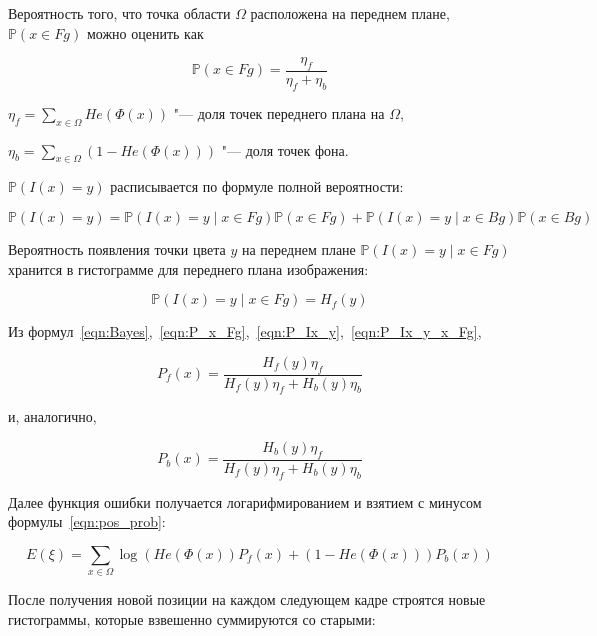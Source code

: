 Вероятность того, что точка области $\Omega$ расположена на переднем плане,
$\mathbb{P}(x \in Fg)$ можно оценить как

\begin{equation}
\label{eqn:P_x_Fg}
\mathbb{P}(x \in Fg) = \frac{\eta_f}{\eta_f + \eta_b}
\end{equation}

$
    \eta_f = \sum\limits_{x \in \Omega}He(\Phi(x))
$ "--- доля точек переднего плана на $\Omega$,

$
    \eta_b = \sum\limits_{x \in \Omega}(1 - He(\Phi(x)))
$ "--- доля точек фона.

$\mathbb{P}(I(x) = y)$ расписывается по формуле полной вероятности:

\begin{equation}
\label{eqn:P_Ix_y}
\mathbb{P}(I(x) = y) = \mathbb{P}(I(x) = y \mid x \in Fg) \mathbb{P}(x \in Fg)
+ \mathbb{P}(I(x) = y \mid x \in Bg) \mathbb{P}(x \in Bg)
\end{equation}

Вероятность появления точки цвета $y$ на переднем плане $\mathbb{P}(I(x) = y
\mid x \in Fg)$ хранится в гистограмме для переднего плана изображения:

\begin{equation}
\label{eqn:P_Ix_y_x_Fg}
\mathbb{P}(I(x) = y \mid x \in Fg) = H_f(y)
\end{equation}

Из
формул~\ref{eqn:Bayes},~\ref{eqn:P_x_Fg},~\ref{eqn:P_Ix_y},~\ref{eqn:P_Ix_y_x_Fg},

\begin{equation}
\label{eqn:P_x_Fg_y}
P_f(x)= \frac{H_f(y)\eta_f}{H_f(y)\eta_f + H_b(y)\eta_b}
\end{equation}

и, аналогично,

\begin{equation}
\label{eqn:P_x_Bg_y}
P_b(x) = \frac{H_b(y)\eta_f}{H_f(y)\eta_f + H_b(y)\eta_b}
\end{equation}

Далее функция ошибки получается логарифмированием и взятием с минусом
формулы~\ref{eqn:pos_prob}:

\begin{equation}
\label{err_func}
E(\xi) = \sum\limits_{x \in \Omega}
\log(He(\Phi(x))P_f(x) + (1 - He(\Phi(x)))P_b(x))
\end{equation}

После получения новой позиции на каждом следующем кадре строятся новые
гистограммы, которые взвешенно суммируются со старыми: 

